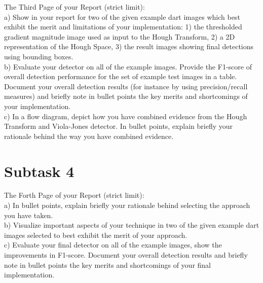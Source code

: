 \documentclass[conference]{IEEEtran}
\begin{document}
The Third Page of your Report (strict limit):\\
a) Show in your report for two of the given example dart
images which best exhibit the merit and limitations of your
implementation: 1) the thresholded gradient magnitude
image used as input to the Hough Transform, 2) a 2D
representation of the Hough Space, 3) the result images
showing final detections using bounding boxes.\\
b) Evaluate your detector on all of the example images.
Provide the F1-score of overall detection performance for
the set of example test images in a table. Document your
overall detection results (for instance by using
precision/recall measures) and briefly note in bullet points
the key merits and shortcomings of your implementation.\\
c) In a flow diagram, depict how you have combined
evidence from the Hough Transform and Viola-Jones
detector. In bullet points, explain briefly your rationale
behind the way you have combined evidence.

\section{Subtask 4}

The Forth Page of your Report (strict limit):\\
a) In bullet points, explain briefly your rationale behind
selecting the approach you have taken.\\
b) Visualize important aspects of your technique in two of
the given example dart images selected to best exhibit the
merit of your approach.\\
c) Evaluate your final detector on all of the example images,
show the improvements in F1-score. Document your
overall detection results and briefly note in bullet points
the key merits and shortcomings of your final
implementation.
\end{document}
